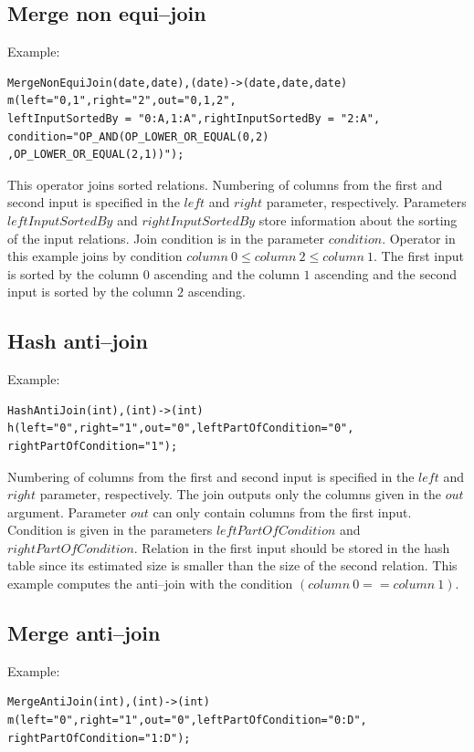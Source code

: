 \subsection{Merge non equi--join}
Example:
\begin{lstlisting}
MergeNonEquiJoin(date,date),(date)->(date,date,date)
m(left="0,1",right="2",out="0,1,2",
leftInputSortedBy = "0:A,1:A",rightInputSortedBy = "2:A",
condition="OP_AND(OP_LOWER_OR_EQUAL(0,2)
,OP_LOWER_OR_EQUAL(2,1))");
\end{lstlisting}

This operator joins sorted relations. Numbering of columns from the first and second input is specified in the $left$ and $right$ parameter, respectively. Parameters $leftInputSortedBy$ and $rightInputSortedBy$ store information about the sorting of the input relations. Join condition is in the parameter $condition$. Operator in this example joins by condition $column~0 \leq column~2\leq column~1$. The first input is sorted by the column $0$ ascending and the column $1$ ascending and the second input is sorted by the column $2$ ascending.

\subsection{Hash anti--join}
Example:
\begin{lstlisting}
HashAntiJoin(int),(int)->(int)
h(left="0",right="1",out="0",leftPartOfCondition="0",
rightPartOfCondition="1"); 
\end{lstlisting}

Numbering of columns from the first and second input is specified in the $left$ and $right$ parameter, respectively. The join outputs only the columns given in the $out$ argument. Parameter $out$ can only contain columns from the first input. Condition is given in the parameters $leftPartOfCondition$ and $rightPartOfCondition$.
Relation in the first input should be stored in the hash table since its estimated size is smaller than the size of the second relation. This example computes the anti--join with the condition $(column~0==column~1)$.

\subsection{Merge anti--join}
Example:
\begin{lstlisting}
MergeAntiJoin(int),(int)->(int)
m(left="0",right="1",out="0",leftPartOfCondition="0:D",
rightPartOfCondition="1:D");
\end{lstlisting}

